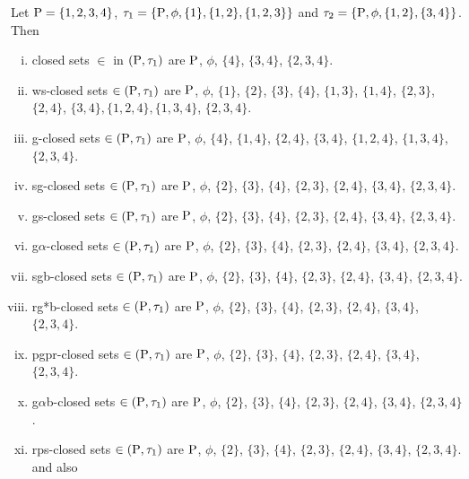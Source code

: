 \begin{exm}\label{exm2.1.9}
Let $\mathrm{P} = \{1, 2, 3, 4\}$, $\tau_{1} =\{\mathrm{P}, \phi, \{1\}, \{1, 2\},\{1, 2, 3\}\}$ and $\tau_{2} =\{\mathrm{P}, \phi, \{1, 2\},\{3, 4\}\}$. Then
\begin{enumerate}[(i)]
\item closed sets $\in$ in $(\mathrm{P}, \tau_{1})$ are $\mathrm{P}$, $\phi$, $\{4\}$, $\{3, 4\}$, $\{2, 3, 4\}$.
\item ws-closed sets $\in(\mathrm{P}, \tau_{1})$ are $\mathrm{P}$, $\phi$, $\{1\}$, $\{2\}$, $\{3\}$, $\{4\}$, $\{1, 3\}$, $\{1, 4\}$, $\{2, 3\}$, $\{2, 4\}$, $\{3, 4\}, \{1, 2, 4\}, \{1, 3, 4\}$, $\{2, 3, 4\}$.
\item g-closed sets $\in(\mathrm{P}, \tau_{1})$ are $\mathrm{P}$, $\phi$, $\{4\}$, $\{1, 4\}$, $\{2, 4\}$, $\{3, 4\}$, $\{1, 2, 4\}$, $\{1, 3, 4\}$, $\{2, 3, 4\}$.
\item sg-closed sets $\in(\mathrm{P}, \tau_{1})$ are $\mathrm{P}$, $\phi$, $\{2\}$, $\{3\}$, $\{4\}$, $\{2, 3\}$, $\{2, 4\}$, $\{3, 4\}$, $\{2, 3, 4\}$.
\item gs-closed sets $\in(\mathrm{P}, \tau_{1})$ are $\mathrm{P}$, $\phi$, $\{2\}$, $\{3\}$, $\{4\}$, $\{2, 3\}$, $\{2, 4\}$, $\{3, 4\}$, $\{2, 3, 4\}$.
\item g$\alpha$-closed sets $\in(\mathrm{P}, \tau_{1})$ are $\mathrm{P}$, $\phi$, $\{2\}$, $\{3\}$, $\{4\}$, $\{2, 3\}$, $\{2, 4\}$, $\{3, 4\}$, $\{2, 3, 4\}$.
\item sgb-closed sets $\in(\mathrm{P}, \tau_{1})$ are $\mathrm{P}$, $\phi$, $\{2\}$, $\{3\}$, $\{4\}$, $\{2, 3\}$, $\{2, 4\}$, $\{3, 4\}$, $\{2, 3, 4\}$.
\item rg*b-closed sets $\in(\mathrm{P}, \tau_{1})$ are $\mathrm{P}$, $\phi$, $\{2\}$, $\{3\}$, $\{4\}$, $\{2, 3\}$, $\{2, 4\}$, $\{3, 4\}$, $\{2, 3, 4\}$.
\item pgpr-closed sets $\in(\mathrm{P}, \tau_{1})$ are $\mathrm{P}$, $\phi$, $\{2\}$, $\{3\}$, $\{4\}$, $\{2, 3\}$, $\{2, 4\}$, $\{3, 4\}$, $\{2, 3, 4\}$.
\item g$\alpha$b-closed sets $\in(\mathrm{P}, \tau_{1})$ are $\mathrm{P}$, $\phi$, $\{2\}$, $\{3\}$, $\{4\}$, $\{2, 3\}$, $\{2, 4\}$, $\{3, 4\}$, $\{2, 3, 4\}$.
\item rps-closed sets $\in(\mathrm{P}, \tau_{1})$ are $\mathrm{P}$, $\phi$, $\{2\}$, $\{3\}$, $\{4\}$, $\{2, 3\}$, $\{2, 4\}$, $\{3, 4\}$, $\{2, 3, 4\}$. and also
\end{enumerate}


\end{exm}
